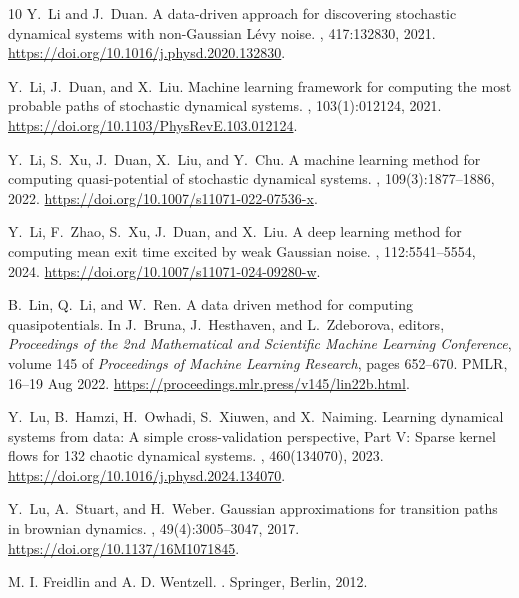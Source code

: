 \begin{thebibliography}{10}
Y.~Li and J.~Duan.
\newblock A data-driven approach for discovering stochastic dynamical systems
  with non-{G}aussian {L}\'evy noise.
, 417:132830, 2021.
\newblock \url{https://doi.org/10.1016/j.physd.2020.132830}.

Y.~Li, J.~Duan, and X.~Liu.
\newblock Machine learning framework for computing the most probable paths of
  stochastic dynamical systems.
, 103(1):012124, 2021.
\newblock \url{https://doi.org/10.1103/PhysRevE.103.012124}.

Y.~Li, S.~Xu, J.~Duan, X.~Liu, and Y.~Chu.
\newblock A machine learning method for computing quasi-potential of stochastic
  dynamical systems.
, 109(3):1877--1886, 2022.
\newblock \url{https://doi.org/10.1007/s11071-022-07536-x}.

Y.~Li, F.~Zhao, S.~Xu, J.~Duan, and X.~Liu.
\newblock A deep learning method for computing mean exit time excited by weak
  {G}aussian noise.
, 112:5541--5554, 2024.
\newblock \url{https://doi.org/10.1007/s11071-024-09280-w}.

B.~Lin, Q.~Li, and W.~Ren.
\newblock A data driven method for computing quasipotentials.
\newblock In J.~Bruna, J.~Hesthaven, and L.~Zdeborova, editors, {\em
  Proceedings of the 2nd Mathematical and Scientific Machine Learning
  Conference}, volume 145 of {\em Proceedings of Machine Learning Research},
  pages 652--670. PMLR, 16--19 Aug 2022.
\newblock \url{https://proceedings.mlr.press/v145/lin22b.html}.

Y.~Lu, B.~Hamzi, H.~Owhadi, S.~Xiuwen, and X.~Naiming.
\newblock Learning dynamical systems from data: A simple cross-validation
  perspective, {P}art {V}: Sparse kernel flows for 132 chaotic dynamical
  systems.
, 460(134070), 2023.
\newblock \url{https://doi.org/10.1016/j.physd.2024.134070}.

Y.~Lu, A.~Stuart, and H.~Weber.
\newblock Gaussian approximations for transition paths in brownian dynamics.
, 49(4):3005--3047, 2017.
\newblock \url{https://doi.org/10.1137/16M1071845}.

{M. I. Freidlin and A. D. Wentzell}.
.
\newblock Springer, Berlin, 2012.


\end{thebibliography}
